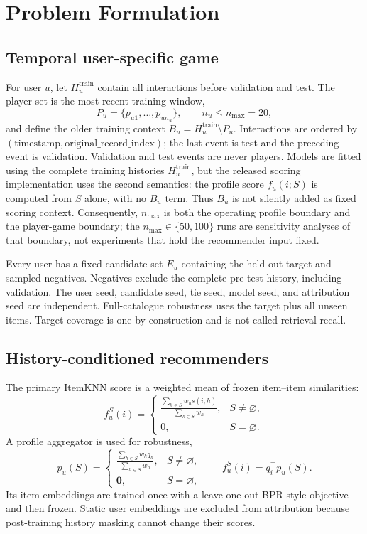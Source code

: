 \documentclass[pdflatex,sn-basic,Numbered]{sn-jnl}
\theoremstyle{thmstyleone}
\theoremstyle{thmstyletwo}
\theoremstyle{thmstylethree}
\begin{document}
\section{Problem Formulation}
\subsection{Temporal user-specific game}
For user $u$, let $H_u^{\mathrm{train}}$ contain all interactions before validation and test. The player set is the most recent training window,
\begin{equation}
P_u=\{p_{u1},\ldots,p_{un_u}\},\qquad n_u\le n_{\max}=20,
\end{equation}
and define the older training context $B_u=H_u^{\mathrm{train}}\setminus P_u$. Interactions are ordered by $(\mathrm{timestamp},\mathrm{original\_record\_index})$; the last event is test and the preceding event is validation. Validation and test events are never players. Models are fitted using the complete training histories $H_u^{\mathrm{train}}$, but the released scoring implementation uses the second semantics: the profile score $f_u(i;S)$ is computed from $S$ alone, with no $B_u$ term. Thus $B_u$ is not silently added as fixed scoring context. Consequently, $n_{\max}$ is both the operating profile boundary and the player-game boundary; the $n_{\max}\in\{50,100\}$ runs are sensitivity analyses of that boundary, not experiments that hold the recommender input fixed.

Every user has a fixed candidate set $E_u$ containing the held-out target and sampled negatives. Negatives exclude the complete pre-test history, including validation. The user seed, candidate seed, tie seed, model seed, and attribution seed are independent. Full-catalogue robustness uses the target plus all unseen items. Target coverage is one by construction and is not called retrieval recall.

\subsection{History-conditioned recommenders}
The primary ItemKNN score is a weighted mean of frozen item--item similarities:
\begin{equation}
f_u^S(i)=
\begin{cases}
\displaystyle\frac{\sum_{h\in S}w_hs(i,h)}{\sum_{h\in S}w_h},&S\ne\varnothing,\\[6pt]
0,&S=\varnothing.
\end{cases}
\end{equation}
A profile aggregator is used for robustness,
\begin{equation}
p_u(S)=
\begin{cases}
\displaystyle\frac{\sum_{h\in S}w_hq_h}{\sum_{h\in S}w_h},&S\ne\varnothing,\\[6pt]
\mathbf 0,&S=\varnothing,
\end{cases}
\qquad f_u^S(i)=q_i^\top p_u(S).
\end{equation}
Its item embeddings are trained once with a leave-one-out BPR-style objective and then frozen. Static user embeddings are excluded from attribution because post-training history masking cannot change their scores.
\end{document}
